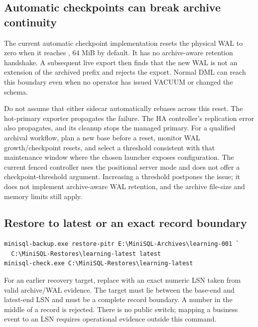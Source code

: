 
\subsection{Automatic checkpoints can break archive continuity}

The current automatic checkpoint implementation resets the physical WAL to
zero when it reaches , 64 MiB by default.
It has no archive-aware retention handshake. A subsequent live export then
finds that the new WAL is not an extension of the archived prefix and rejects
the export. Normal DML can reach this boundary even when no operator has
issued VACUUM or changed the schema.

Do not assume that either sidecar automatically rebases across this reset.
The hot-primary exporter propagates the failure. The HA controller's
replication error also propagates, and its cleanup stops the managed primary.
For a qualified archival workflow, plan a new base before a reset, monitor
WAL growth/checkpoint resets, and select a threshold consistent with that
maintenance window where the chosen launcher exposes configuration. The
current fenced controller uses the positional server mode and does not offer
a checkpoint-threshold argument. Increasing a threshold postpones the issue;
it does not implement archive-aware WAL retention, and the archive file-size
and memory limits still apply.


\subsection{Restore to latest or an exact record boundary}

\begin{lstlisting}
minisql-backup.exe restore-pitr E:\MiniSQL-Archives\learning-001 `
  C:\MiniSQL-Restores\learning-latest latest
minisql-check.exe C:\MiniSQL-Restores\learning-latest
\end{lstlisting}

For an earlier recovery target, replace  with an exact numeric
LSN taken from valid archive/WAL evidence. The target must lie between the
base-end and latest-end LSN and must be a complete record boundary. A number
in the middle of a record is rejected. There is no public
 switch; mapping a business event to an LSN
requires operational evidence outside this command.

